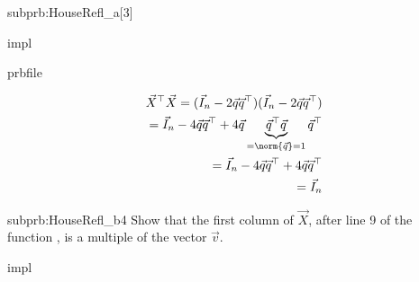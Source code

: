 \begin{problem}
\begin{subproblem}{subprb:HouseRefl_a}[3]
  \begin{samwriteprbpart}{impl}
    \begin{writeverbatim}{prbfile}
      \begin{samsolution}
        \begin{align*}
          \vec{X}^\top \vec{X} = (\vec{I}_n - 2 \vec{q}\vec{q}^\top)(\vec{I}_n - 2 \vec{q}\vec{q}^\top) \\
   = \vec{I}_n - 4 \vec{q}\vec{q}^\top + 4 \vec{q} \underbrace{\vec{q}^\top\vec{q}}_{=\norm{\vec{q}}=1}\vec{q}^\top \\
   = \vec{I}_n - 4 \vec{q}\vec{q}^\top + 4 \vec{q}\vec{q}^\top \\
   = \vec{I}_n
        \end{align*}
      \end{samsolution}
    \end{writeverbatim}
  \end{samwriteprbpart}
\end{subproblem}

\begin{subproblem}{subprb:HouseRefl_b}{4}
  Show that the first column of $\vec{X}$, after line 9 of the
  function , is a multiple of the vector $\vec{v}$.

  \begin{samwriteprbpart}{impl}
    \begin{writeverbatim}{prbfile
        \begin{samhint}
          Use the previous hint, and the facts that
          \begin{align*}
            \vec{u} = \vec{w} + \begin{bmatrix}
              1 \\
              0 \\
              \vdots \\
              0
            \end{bmatrix}
          \end{align*}
          and $\norm{\vec{w}} = 1$.
      \end{samhint}
    \end{writeverbatim}
  \end{samwriteprbpart}



\end{subproblem}
\end{problem}
